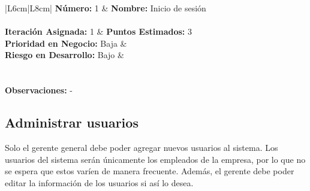 \documentclass[a4paper, 12pt,twoside]{report}  %
\numberwithin{equation}{subsection} %
\begin{document}
\begin{table}[h!]
	\centering
	\begin{tabularx}
		{\textwidth}{|L{6cm}|L{8cm}|}
		\hline 
		\textbf{Número:} 1 & \textbf{Nombre:} Inicio de sesión \\ \hline
		\\ \hline
		\textbf{Iteración Asignada:} 1 & \textbf{Puntos Estimados:} 3 \\ \hline
		\textbf{Prioridad en Negocio:} Baja & \\
		 \textbf{Riesgo en Desarrollo:} Bajo & \\ \hline
		\\
		
		\hline
		\\
		
		\hline
		{\textbf{Observaciones:} - }\\
		
		\hline
	\end{tabularx}
	\caption*{Tabla A.: Refinamiento de \hyperlink{US}{US} 1.}
\end{table}


\pagebreak

\subsection*{Administrar usuarios}
Solo el gerente general debe poder agregar nuevos usuarios al sistema. Los usuarios del sistema serán únicamente los empleados de la empresa, por lo que no se espera que estos varíen de manera frecuente. Además, el gerente debe poder editar la información de los usuarios  si así lo desea.

\renewcommand{\arraystretch}{1.4}
\end{document}

